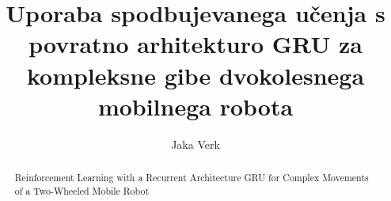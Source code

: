\documentclass[a4paper]{article}
\begin{document}
\title{Uporaba spodbujevanega učenja s povratno arhitekturo GRU za kompleksne gibe dvokolesnega mobilnega robota}
\author{Jaka Verk$$} 


\maketitle


\begin{abstract}{Reinforcement Learning with a Recurrent Architecture GRU for Complex Movements of a Two-Wheeled Mobile Robot}

\end{abstract}




  
  









  

  




  
\small

\end{document}
